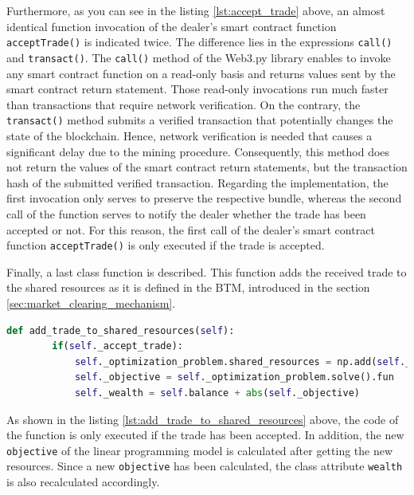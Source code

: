 Furthermore, as you can see in the listing \ref{lst:accept_trade} above, an almost 
identical function invocation of the dealer's smart contract 
function \verb|acceptTrade()| is indicated twice. 
The difference lies in the expressions \verb|call()| and \verb|transact()|. 
The \verb|call()| method of the Web3.py library enables to invoke any smart contract function on a read-only basis
and returns values sent by the smart contract return statement. 
Those read-only invocations run much faster than transactions that require network verification.
On the contrary, the \verb|transact()| method submits a verified transaction that potentially changes the state of the blockchain. 
Hence, network verification is needed that causes a significant delay due to the mining procedure.
Consequently, this method does not return the values of the smart contract return statements,
but the transaction hash of the submitted verified transaction.
Regarding the implementation, the first invocation only serves to preserve the respective bundle,
whereas the second call of the function serves to notify the dealer whether the trade has been accepted or not.
For this reason, the first call of the dealer's smart contract function \verb|acceptTrade()| 
is only executed if the trade is accepted. 

Finally, a last class function is described. This function adds the received trade to the shared resources
as it is defined in the BTM, introduced in the section \ref{sec:market_clearing_mechanism}.

\begin{lstlisting}[float=htbp, label=lst:add_trade_to_shared_resources, caption=Adding of trade to shared resources, language=Python]
    def add_trade_to_shared_resources(self):
        if(self._accept_trade):
            self._optimization_problem.shared_resources = np.add(self._optimization_problem.shared_resources, self._trade)
            self._objective = self._optimization_problem.solve().fun  
            self._wealth = self.balance + abs(self._objective)
\end{lstlisting}

As shown in the listing \ref{lst:add_trade_to_shared_resources} above, the code of the function 
is only executed if the trade has been accepted. 
In addition, the new \verb|objective| of the linear programming model is calculated after getting the new resources.
Since a new \verb|objective| has been calculated, the class attribute \verb|wealth| is also recalculated accordingly.



